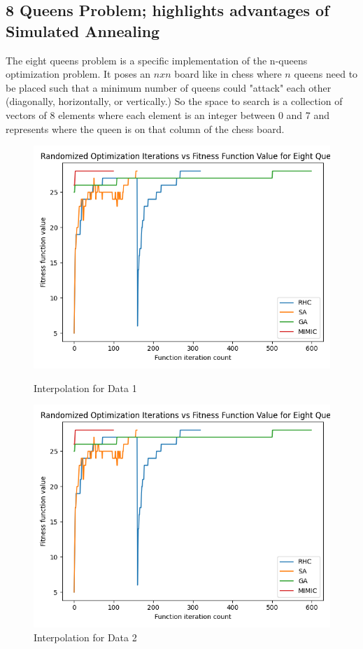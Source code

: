 \documentclass[11pt]{article}
\newcommand{\problemtwo}{8 Queens Problem}
\begin{document}
    \subsection{\problemtwo \hspace{0em}; highlights advantages of Simulated Annealing}
    The eight queens problem is a specific implementation of the n-queens optimization problem.\cite{Russel10} It poses
    an $n x n$ board like in chess where $n$ queens need to be placed such that a minimum number of queens could "attack"
    each other (diagonally, horizontally, or vertically.) So the space to search is a collection of vectors of 8 elements
    where each element is an integer between 0 and 7 and represents where the queen is on that column of the chess board.
    \linebreak
    \begin{figure}[!htb]
        \begin{minipage}{0.5\textwidth}
            \centering
            \includegraphics[width=0.9\linewidth]{eightqueens1.png}
            \caption{Interpolation for Data 1}\label{Fig:Eight Queens Iterations vs Fitness Function Value}
        \end{minipage}\hfill
        \begin{minipage}{0.5\textwidth}
            \centering
            \includegraphics[width=0.9\linewidth]{eightqueens2.png}
            \caption{Interpolation for Data 2}\label{Fig:Eight Queens Iterations vs Time}
        \end{minipage}
    \end{figure}
\end{document}
